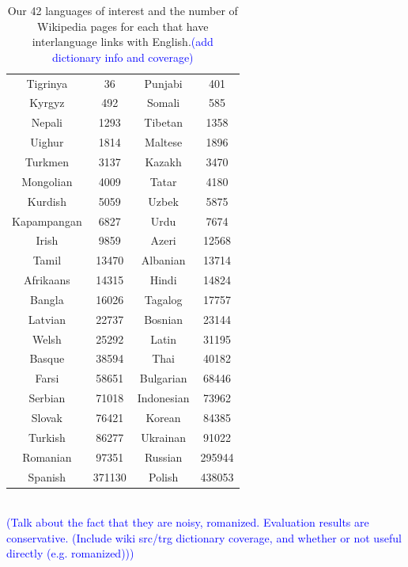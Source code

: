 \documentclass{article}
\newcommand{\todo}[1]{\textcolor{blue}{(#1)}}
\begin{document}
\begin{table}[h]
\small
\begin{center}
\begin{tabular}{cc|cc}
Tigrinya	&	36	&	Punjabi 	&	401	\\ 	
Kyrgyz	&	492	&	Somali 	&	585	\\ 	
Nepali 	&	1293	&	Tibetan	&	1358\\
Uighur	&	1814	&	Maltese 	&	1896\\
Turkmen	&	3137	&	Kazakh 	&	3470\\
Mongolian 	&	4009	&	Tatar	&	4180\\
Kurdish	&	5059	&	Uzbek 	&	5875\\
Kapampangan	&	6827	&	Urdu 	&	7674\\
Irish 	&	9859	&	Azeri	&	12568\\
Tamil	&	13470	&	Albanian 	&	13714\\
Afrikaans	&	14315	&	Hindi 	&	14824\\
Bangla 	&	16026	&	Tagalog	&	17757\\
Latvian	&	22737	&	Bosnian 	&	23144\\
Welsh	&	25292	&	Latin 	&	31195\\
Basque 	&	38594	&	Thai	&	40182\\
Farsi	&	58651	&	Bulgarian 	&	68446\\
Serbian	&	71018	&	Indonesian 	&	73962\\
Slovak 	&	76421	&	Korean	&	84385\\
Turkish 	&	86277	&	Ukrainan	&	91022\\
Romanian 	&	97351	&	Russian	&	295944\\
Spanish 	&	371130	&	Polish	&	438053\\

\end{tabular}
\end{center}
\normalsize
\caption{Our 42 languages of interest and the number of Wikipedia pages for each that have interlanguage links with English.\todo{add dictionary info and coverage}}
\label{lang-table}
\end{table}
 
\\ 

\todo{Talk about the fact that they are noisy, romanized.  Evaluation results are conservative.  \todo{Include wiki src/trg dictionary coverage, and whether or not useful directly (e.g. romanized)}}\\
\end{document}
